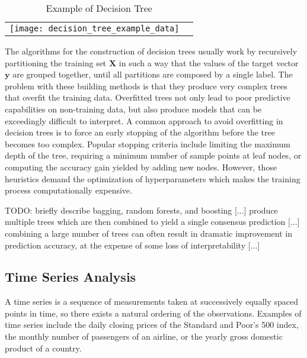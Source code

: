 \begin{table}
    \begin{center}

        \begin{tabular}{ c c }

            \texttt{[image: decision\_tree\_example\_data]} & \raisebox{.4\height}{\texttt{[image: decision\_tree\_example]}}
        \end{tabular}
    \end{center}
    \caption{\label{tab:DecisionTreeExample}Example of Decision Tree}
\end{table}

The algorithms for the construction of decision trees usually work by recursively partitioning the training set $\mathbf{X}$ in such a way that the values of the target vector $\textbf{y}$ are grouped together, until all partitions are composed by a single label. The problem with these building methods is that they produce very complex trees that overfit the training data. Overfitted trees not only lead to poor predictive capabilities on non-training data, but also produce models that can be exceedingly difficult to interpret. A common approach to avoid overfitting in decision trees is to force an early stopping of the algorithm before the tree becomes too complex. Popular stopping criteria include limiting the maximum depth of the tree, requiring a minimum number of sample points at leaf nodes, or computing the accuracy gain yielded by adding new nodes. However, those heuristics demand the optimization of hyperparameters which makes the training process computationally expensive.

    {\color{red} TODO: briefly describe bagging, random forests, and boosting [...] produce multiple trees which are then combined to yield a single consensus prediction [...] combining a large number of trees can often result in dramatic improvement in prediction accuracy, at the expense of some loss of interpretability [...]}


\subsection{Time Series Analysis}
\label{sec:intro_time_series}

A time series is a sequence of measurements taken at successively equally spaced points in time, so there exists a natural ordering of the observations. Examples of time series include the daily closing prices of the Standard and Poor's 500 index, the monthly number of passengers of an airline, or the yearly gross domestic product of a country.

